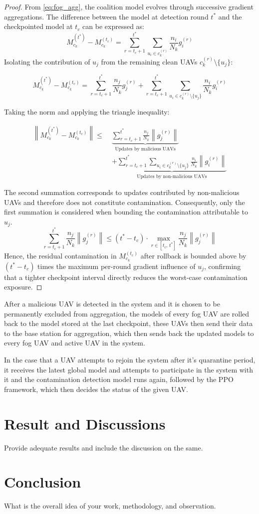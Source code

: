 \documentclass[10pt,journal,compsoc]{IEEEtran}
\begin{document}
\begin{proof}
From \eqref{eq:fog_agg}, the coalition model evolves 
through successive gradient aggregations. The difference 
between the model at detection round $t^*$ and the 
checkpointed model at $t_c$ can be expressed as:
\[
M_{c_k}^{(t^*)} - M_{c_k}^{(t_c)} 
= \sum_{r=t_c+1}^{t^*} \sum_{u_i \in c_k^{(r)}} 
\frac{n_i}{N_k} g_i^{(r)}
\]
Isolating the contribution of $u_j$ from the remaining 
clean UAVs $c_k^{(r)} \setminus \{u_j\}$:

\[
M_{c_k}^{(t^*)} - M_{c_k}^{(t_c)} 
= \sum_{r=t_c+1}^{t^*} \frac{n_j}{N_k} g_j^{(r)}
+ \sum_{r=t_c+1}^{t^*} \sum_{u_i \in c_k^{(r)} \setminus \{u_j\}} 
\frac{n_i}{N_k} g_i^{(r)}
\]

Taking the norm and applying the triangle inequality:

\[
\begin{aligned}
\left\| M_{c_k}^{(t^*)} - M_{c_k}^{(t_c)} \right\|
\leq\;&
\underbrace{
\sum_{r=t_c+1}^{t^*} \frac{n_j}{N_k} \left\| g_j^{(r)} \right\|
}_{\text{Updates by malicious UAVs}}
\\
&+
\underbrace{
\sum_{r=t_c+1}^{t^*} \sum_{u_i \in c_k^{(r)} \setminus \{u_j\}}
\frac{n_i}{N_k} \left\| g_i^{(r)} \right\|
}_{\text{Updates by non-malicious UAVs}}
\end{aligned}
\]

The second summation corresponds to updates contributed by non-malicious UAVs and therefore does not constitute contamination. Consequently, only the first summation is considered when bounding the contamination attributable to $u_j$.
\[
\sum_{r=t_c+1}^{t^*} \frac{n_j}{N_k} \left\| g_j^{(r)} \right\|
\leq 
(t^* - t_c) \cdot \max_{r \in [t_c,\, t^*]} 
\frac{n_j}{N_k} \left\| g_j^{(r)} \right\|
\]
Hence, the residual contamination in $M_{c_k}^{(t_c)}$ 
after rollback is bounded above by $(t^* - t_c)$ times 
the maximum per-round gradient influence of $u_j$, 
confirming that a tighter checkpoint interval directly 
reduces the worst-case contamination exposure.
\end{proof}


After a malicious UAV is detected in the system and it is chosen to be permanently excluded from aggregation, the models of every fog UAV are rolled back to the model stored at the last checkpoint, these UAVs then send their data to the base station for aggregation, which then sends back the updated models to every fog UAV and active UAV in the system.

In the case that a UAV attempts to rejoin the system after it's quarantine period, it receives the latest global model and attempts to participate in the system with it and the contamination detection model runs again, followed by the PPO framework, which then decides the status of the given UAV.

%
%
%
\section{Result and Discussions}
Provide adequate results and include the discussion on the same.

%
%
%
\section{Conclusion}
What is the overall idea of your work, methodology, and observation.



\end{document}
